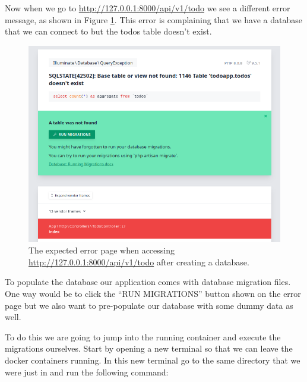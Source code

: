 \documentclass{csse4400}
\begin{document}
Now when we go to \url{http://127.0.0.1:8000/api/v1/todo} we see a different error message, as shown in Figure \ref{fig:missing-tables}.
This error is complaining that we have a database that we can connect to but the todos table doesn't exist.

\begin{figure}[ht]
\includegraphics[width=\textwidth]{images/missing-tables}
\caption{The expected error page when accessing \url{http://127.0.0.1:8000/api/v1/todo} after creating a database.}
\label{fig:missing-tables}
\end{figure}

To populate the database our application comes with database migration files.
One way would be to click the ``RUN MIGRATIONS'' button shown on the error page but we also want to pre-populate our database with some dummy data as well.

To do this we are going to jump into the running container and execute the migrations ourselves.
Start by opening a new terminal so that we can leave the docker containers running.
In this new terminal go to the same directory that we were just in and run the following 
command:

\end{document}
